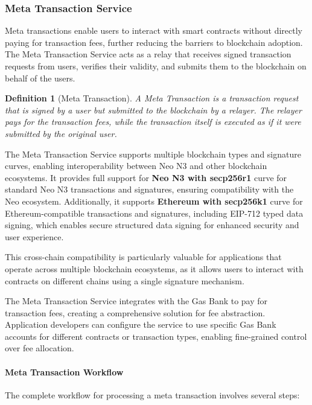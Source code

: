 \documentclass[11pt]{article}
\newtheorem{definition}{Definition}
\begin{document}
\subsubsection{Meta Transaction Service}
\label{subsubsec:meta-tx}

Meta transactions enable users to interact with smart contracts without directly paying for transaction fees, further reducing the barriers to blockchain adoption. The Meta Transaction Service acts as a relay that receives signed transaction requests from users, verifies their validity, and submits them to the blockchain on behalf of the users.



\begin{definition}[Meta Transaction]
A Meta Transaction is a transaction request that is signed by a user but submitted to the blockchain by a relayer. The relayer pays for the transaction fees, while the transaction itself is executed as if it were submitted by the original user.
\end{definition}

The Meta Transaction Service supports multiple blockchain types and signature curves, enabling interoperability between Neo N3 and other blockchain ecosystems. It provides full support for \textbf{Neo N3 with secp256r1} curve for standard Neo N3 transactions and signatures, ensuring compatibility with the Neo ecosystem. Additionally, it supports \textbf{Ethereum with secp256k1} curve for Ethereum-compatible transactions and signatures, including EIP-712 typed data signing, which enables secure structured data signing for enhanced security and user experience.

This cross-chain compatibility is particularly valuable for applications that operate across multiple blockchain ecosystems, as it allows users to interact with contracts on different chains using a single signature mechanism.

The Meta Transaction Service integrates with the Gas Bank to pay for transaction fees, creating a comprehensive solution for fee abstraction. Application developers can configure the service to use specific Gas Bank accounts for different contracts or transaction types, enabling fine-grained control over fee allocation.



\paragraph{Meta Transaction Workflow}
The complete workflow for processing a meta transaction involves several steps:
\end{document}
